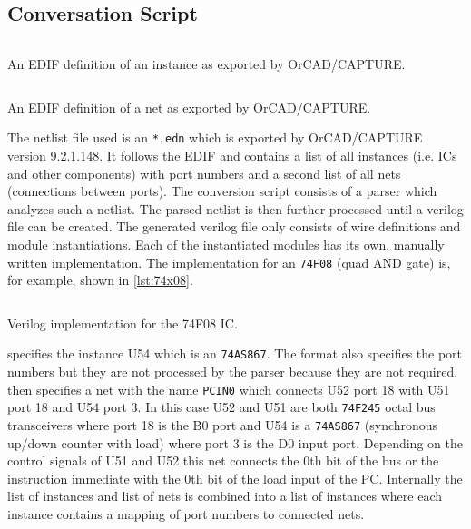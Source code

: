 \subsection{Conversation Script}
\begin{listing}
  \inputminted[linenos,
    breaklines,
    frame=leftline,
    xleftmargin=20pt,
  ]{clojure}{src/edifInstance.edn}
  \caption{An \gls{EDIF} definition of an instance as exported by OrCAD/CAPTURE.}
  \label{lst:edifInstance}
\end{listing}
\begin{listing}
  \inputminted[linenos,
    breaklines,
    frame=leftline,
    xleftmargin=20pt,
  ]{clojure}{src/edifNet.edn}
  \caption{An \gls{EDIF} definition of a net as exported by OrCAD/CAPTURE.}
  \label{lst:edifNet}
\end{listing}
The netlist file used is an \texttt{*.edn} which is exported by OrCAD/CAPTURE version 9.2.1.148.
It follows the \gls{EDIF} and contains a list of all instances (i.e. \glspl{IC} and other components) with port numbers and a second list of all nets (connections between ports).
The conversion script consists of a parser which analyzes such a netlist.
The parsed netlist is then further processed until a verilog file can be created.
The generated verilog file only consists of wire definitions and module instantiations.
Each of the instantiated modules has its own, manually written implementation.
The implementation for an \texttt{74F08} (quad AND gate) is, for example, shown in \cref{lst:74x08}.
\begin{listing}[t]
  \inputminted[linenos,
    breaklines,
    frame=leftline,
    xleftmargin=20pt,
  ]{Verilog}{src/ic74x08.v}
  \caption{Verilog implementation for the 74F08 \gls{IC}.}
  \label{lst:74x08}
\end{listing}

 specifies the instance U54 which is an \texttt{74AS867}.
The format also specifies the port numbers but they are not processed by the parser because they are not required.
 then specifies a net with the name \texttt{PCIN0} which connects U52 port 18 with U51 port 18 and U54 port 3.
In this case U52 and U51 are both \texttt{74F245} octal bus transceivers where port 18 is the B0 port and U54 is a \texttt{74AS867} (synchronous up/down counter with load) where port 3 is the D0 input port.
Depending on the control signals of U51 and U52 this net connects the 0th bit of the bus or the instruction immediate with the 0th bit of the load input of the \gls{PC}.
Internally the list of instances and list of nets is combined into a list of instances where each instance contains a mapping of port numbers to connected nets.

